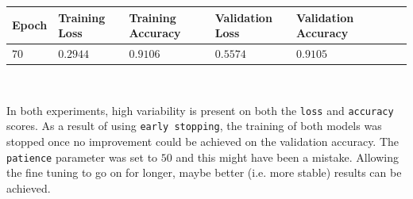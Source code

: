 \documentclass[11pt,a4paper]{article}
\begin{document}
\begin{center}
\hspace*{-0.8cm}
\begin{tabular}{|p{1.2cm}|p{1.8cm}|p{2cm}|p{2cm}|p{2cm}|p{2cm}|p{2cm}|}
\rowcolor{gray!50}
\hline
\textbf{Epoch} & \textbf{Training Loss} & \textbf{Training Accuracy} & \textbf{Validation Loss} & \textbf{Validation Accuracy}\\
\hline
$70$ & $0.2944$ & $0.9106$ & $0.5574$ & $0.9105$\\
\hline
\end{tabular}\\
\end{center}
In both experiments, high variability is present on both the \texttt{loss} and \texttt{accuracy} scores. As a result of using \texttt{early stopping}, the training of both models was stopped once no improvement could be achieved on the validation accuracy. The \texttt{patience} parameter was set to $50$ and this might have been a mistake. Allowing the fine tuning to go on for longer, maybe better (i.e. more stable) results can be achieved.
\end{document}
